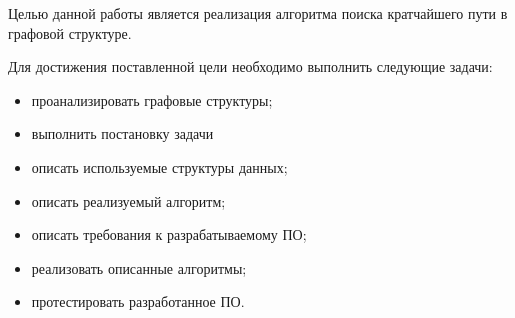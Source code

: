 \Introduction

Целью данной работы является реализация алгоритма поиска кратчайшего пути в графовой структуре.

Для достижения поставленной цели необходимо выполнить следующие задачи:

\begin{itemize}[$\bullet$]
    \item проанализировать графовые структуры;
    \item выполнить постановку задачи
    \item описать используемые структуры данных;
    \item описать реализуемый алгоритм;
    \item описать требования к разрабатываемому ПО;
    \item реализовать описанные алгоритмы;
    \item протестировать разработанное ПО.
\end{itemize}